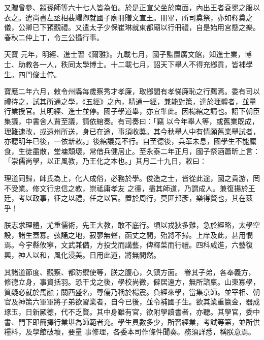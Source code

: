 \begin{pinyinscope}
 又贈曾參、顓孫師等六十七人皆為伯。於是正宣父坐於南面，內出王者袞冕之服以衣之。遣尚書左丞相裴耀卿就國子廟冊贈文宣王。冊畢，所司奠祭，亦如釋奠之儀，公卿已下預觀禮。又遣太子少保崔琳就東都廟以行冊禮，自是始用宮懸之樂。春秋二仲上丁，令三公攝行事。



 天寶
 元年，明經、進士習《爾雅》。九載七月，國子監置廣文館，知進士業，博士、助教各一人，秩同太學博士。十二載七月，詔天下舉人不得充鄉貢，皆補學生。四門俊士停。



 寶應二年六月，敕令州縣每歲察秀才孝廉，取鄉閭有孝悌廉恥之行薦焉。委有司以禮待之，試其所通之學，《五經》之內，精通一經，兼能對策，達於理體者，並量行業授官。其明經、進士並停。國子學道舉，亦宜準此。因楊綰之請也。詔下朝臣集議，中書舍人賈至議，請依綰奏。有司奏曰：「竊
 以今年舉人等，或舊業既成，理難速改，或遠州所送，身已在途，事須收獎。其今秋舉人中有情願舊業舉試者，亦聽明年已後，一依新敕。」後綰議竟不行。自至德後，兵革未息，國學生不能廩食，生徒盡散，堂墉頹壞，常借兵健居止。至永泰二年正月，國子祭酒蕭昕上言：「崇儒尚學，以正風教，乃王化之本也。」其月二十九日，敕曰：



 理道同歸，師氏為上，化人成俗，必務於學。俊造之士，皆從此途，國之貴游，罔不受業。修文行忠信之教，崇祗庸孝友
 之德，盡其師道，乃謂成人。兼復揚於王廷，考以政事，征之以禮，任之以官。置於周行，莫匪邦彥，樂得賢也，其在茲乎！



 朕志求理體，尤重儒術，先王大教，敢不底行。頃以戎狄多難，急於經略，太學空設，諸生蓋寡。弦誦之地，寂寥無聲，函丈之間，殆將不掃。上庠及此，甚用憫焉。今宇縣攸寧，文武兼備，方投戈而講藝，俾釋菜而行禮。四科咸進，六藝復興，神人以和，風化浸美。日用此道，將無間然。



 其諸道節度、觀察、都防禦使等，朕之腹心，久鎮方面。
 眷其子弟，各奉義方，修德立身，事資括羽。恐干戈之後，學校尚微，僻居遠方，無所諮稟。山東寡學，質疑必就於馬融；關西盛名，尊儒乃稱於楊震。負經來學，當集京師。並宰相、朝官及神策六軍軍將子弟欲習業者，自今已後，並令補國子生。欲其業重籝金，器成琢玉，日新厥德，代不乏賢。其中身雖有官，欲附學讀書者，亦聽。其學官，委中書、門下即簡擇行業堪為師範者充。學生員數多少，所習經業，考試等第，並所供糧料，及學館破壞，要量
 事修理，各委本司作條件聞奏。務須詳悉，稱朕意焉。




\end{pinyinscope}
